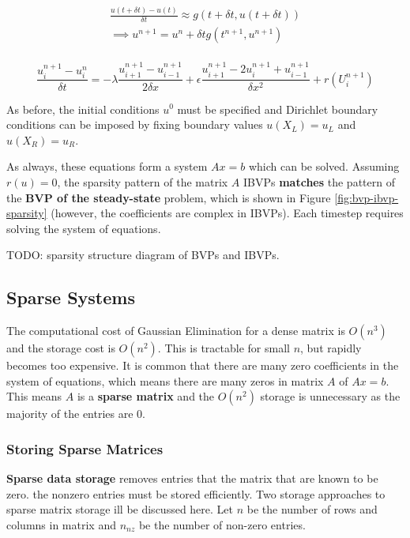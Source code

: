 \documentclass{article}
\begin{document}
\begin{multline}\\
	\frac{u(t + \delta t) - u(t)}{\delta t} \approx g(t + \delta t, u(t + \delta t)) \\
	\implies u^{n+1}= u^n + \delta t g(t^{n+1}, u^{n+1})
	\label{eq:ibvp-backward-euler}
\\ \end{multline}

\begin{equation}
	\frac{u_i^{n + 1} - u_i^n}{\delta t} = -\lambda \frac{u_{i+1}^{n+1} - u_{i-1}^{n+1}}{2 \delta x} + \epsilon \frac{u_{i+1}^{n+1} - 2u_{i}^{n+1} + u_{i-1}^{n+1}}{\delta x^2} + r(U_i^{n+1})
	\label{eq:ivbp-approx-final2}
\end{equation}

As before, the initial conditions $u^0$ must be specified and Dirichlet boundary conditions can be imposed by fixing boundary values $u(X_L) = u_L$ and $u(X_R) = u_R$. 

As always, these equations form a system $Ax = b$ which can be solved. Assuming $r(u) = 0$, the sparsity pattern of the matrix $A$ IBVPs \textbf{matches} the pattern of the \textbf{BVP of the steady-state} problem, which is shown in Figure \ref{fig:bvp-ibvp-sparsity} (however, the coefficients are complex in IBVPs). Each timestep requires solving the system of equations.

TODO: sparsity structure diagram of BVPs and IBVPs.

\subsection{Sparse Systems}

The computational cost of Gaussian Elimination for a dense matrix is $O(n^3)$ and the storage cost is $O(n^2)$. This is tractable for small $n$, but rapidly becomes too expensive. It is common that there are many zero coefficients in the system of equations, which means there are many zeros in matrix $A$ of $Ax = b$. This means $A$ is a \textbf{sparse matrix} and the $O(n^2)$ storage is unnecessary as the majority of the entries are 0.

\subsubsection{Storing Sparse Matrices}

\textbf{Sparse data storage} removes entries that the matrix that are known to be zero. the nonzero entries must be stored efficiently. Two storage approaches to sparse matrix storage ill be discussed here. Let $n$ be the number of rows and columns in matrix and $n_{nz}$ be the number of non-zero entries.
\end{document}
